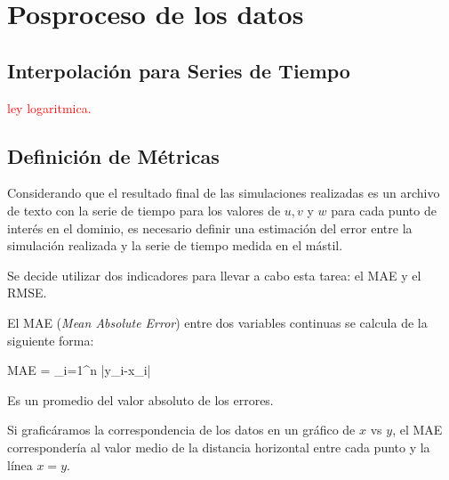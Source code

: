 \begin{table}[H]
	\caption{Detalle de la asimilación en cada mástil en Bolund.}\label{tab:05_mast_da_bol}
	\centering\footnotesize{}
\end{table}

\newpage
\section{Posproceso de los datos}
\subsection{Interpolación para Series de Tiempo}
\textcolor{red}{ley logaritmica.}
\subsection{Definición de Métricas}
Considerando que el resultado final de las simulaciones realizadas es un archivo de texto con la serie de tiempo para los valores de $u,v$ y $w$ para cada punto de interés en el dominio, es necesario definir una estimación del error entre la simulación realizada y la serie de tiempo medida en el mástil.

Se decide utilizar dos indicadores para llevar a cabo esta tarea: el MAE y el RMSE.

El MAE (\emph{Mean Absolute Error}) entre dos variables continuas se calcula de la siguiente forma:

\be 
MAE = \sum_{i=1}^n |y_i-x_i|
\ee

Es un promedio del valor absoluto de los errores.

Si graficáramos la correspondencia de los datos en un gráfico de $x$ vs $y$, el MAE correspondería al valor medio de la distancia horizontal entre cada punto y la línea $x=y$.


